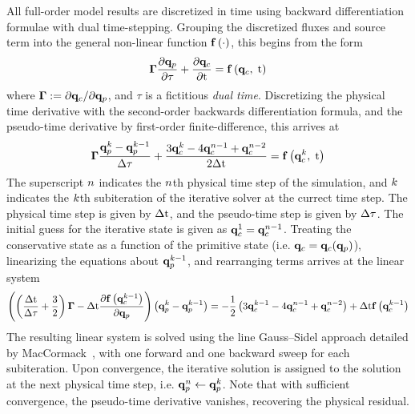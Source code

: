 All full-order model results are discretized in time using backward differentiation formulae with dual time-stepping. Grouping the discretized fluxes and source term into the general non-linear function $\mathbf{f} \left(\cdot\right)$, this begins from the form
%
\begin{equation}
	\boldsymbol{\Gamma} \frac{\partial \mathbf{q}_p}{\partial \tau} + \frac{\partial \mathbf{q}_c}{\partial \text{t}} = \mathbf{f} \left(\mathbf{q}_c, \; \text{t}\right)
\end{equation}
%
where $\boldsymbol{\Gamma} := \partial \mathbf{q}_c / \partial \mathbf{q}_p$, and $\tau$ is a fictitious \textit{dual time}. Discretizing the physical time derivative with the second-order backwards differentiation formula, and the pseudo-time derivative by first-order finite-difference, this arrives at
%
\begin{equation}
	\boldsymbol{\Gamma} \frac{\mathbf{q}_p^{k} - \mathbf{q}_p^{k - 1}}{\Delta \tau} + \frac{3 \mathbf{q}_c^{k} - 4 \mathbf{q}_c^{n - 1} + \mathbf{q}_c^{n - 2}}{2\Delta \text{t}} = \mathbf{f} \left(\mathbf{q}_c^{k}, \; \text{t}\right)
\end{equation}
%
The superscript $n$ indicates the $n$th physical time step of the simulation, and $k$ indicates the $k$th subiteration of the iterative solver at the currect time step. The physical time step is given by $\Delta \text{t}$, and the pseudo-time step is given by $\Delta \tau$. The initial guess for the iterative state is given as $\mathbf{q}_c^1 = \mathbf{q}_c^{n - 1}$. Treating the conservative state as a function of the primitive state (i.e. $\mathbf{q}_c = \mathbf{q}_c(\mathbf{q}_p)$), linearizing the equations about $\mathbf{q}_p^{k - 1}$, and rearranging terms arrives at the linear system
%
\begin{equation}\label{eq:pseudoTimeLinSys}
\left(\left(\frac{\Delta \text{t}}{\Delta \tau} + \frac{3}{2}\right)\boldsymbol{\Gamma} - \Delta \text{t} \frac{\partial \mathbf{f} \left(\mathbf{q}_c^{k - 1}\right)}{\partial \mathbf{q}_p}\right) \left(\mathbf{q}_p^{k} - \mathbf{q}_p^{k - 1}\right) = - \frac{1}{2}\left(3 \mathbf{q}_c^{k-1} - 4 \mathbf{q}_c^{n - 1} + \mathbf{q}_c^{n - 2}\right) + \Delta \text{t} \mathbf{f} \left(\mathbf{q}_c^{k - 1}\right)
\end{equation}
%
The resulting linear system is solved using the line Gauss--Sidel approach detailed by MacCormack~\cite{MacCormack1985}, with one forward and one backward sweep for each subiteration. Upon convergence, the iterative solution is assigned to the solution at the next physical time step, i.e. $\mathbf{q}_p^{n} \leftarrow \mathbf{q}_p^{k}$. Note that with sufficient convergence, the pseudo-time derivative vanishes, recovering the physical residual.

